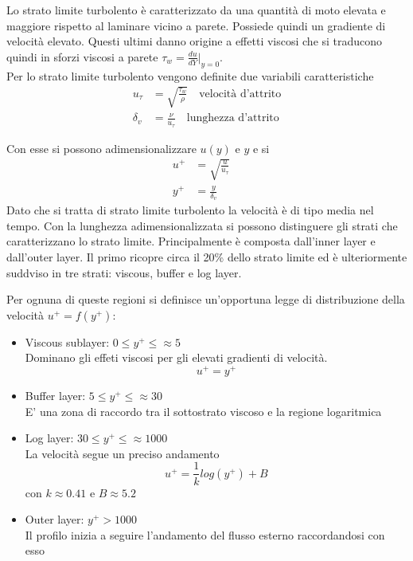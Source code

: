 



Lo strato limite turbolento è caratterizzato da una quantità di moto elevata e maggiore rispetto al laminare vicino a parete. Possiede quindi un gradiente di velocità elevato. Questi ultimi danno origine a effetti viscosi che si traducono quindi in sforzi viscosi a parete $\tau _w = \frac{du}{dY}|_{y = 0}$.\\
Per lo strato limite turbolento vengono definite due variabili caratteristiche
\begin{align*}
    u_{\tau} &= \sqrt{\frac{\tau_w}{\rho}} \quad \text{velocità d'attrito} \\
    \delta_v &= \frac{\nu}{u_\tau} \quad \text{lunghezza d'attrito}
\end{align*}

Con esse si possono adimensionalizzare $u(y)$ e $y$ e si 
\begin{align*}
    u^+ &= \sqrt{\frac{u}{u_\tau}} \quad  \\
    y^+ &= \frac{y}{\delta _v} \quad 
\end{align*}
Dato che si tratta di strato limite turbolento la velocità è di tipo media nel tempo. Con la lunghezza adimensionalizzata si possono distinguere gli strati che caratterizzano lo strato limite. Principalmente è composta dall'inner layer e dall'outer layer. Il primo ricopre circa il 20\% dello strato limite ed è ulteriormente suddviso in tre strati: viscous, buffer e log layer.

Per ognuna di queste regioni si definisce un'opportuna legge di distribuzione della velocità $u^+ = f(y^+)$:
\begin{itemize}
    \item Viscous sublayer: $0 \le y^+ \le \approx 5$\\
    Dominano gli effeti viscosi per gli elevati gradienti di velocità.
    \begin{equation*}
        u^+ = y^+
    \end{equation*}
    \item Buffer layer: $5 \le y^+ \le \approx 30$\\
    E' una zona di raccordo tra il sottostrato viscoso e la regione logaritmica
    \item Log layer: $30 \le y^+ \le \approx 1000$\\
    La velocità segue un preciso andamento 
    \begin{equation*}
        u^+ = \frac{1}{k}log(y^+) + B
    \end{equation*}
    con $k \approx 0.41$ e $B \approx 5.2$
    \item Outer layer: $y^+ > 1000$\\
    Il profilo inizia a seguire l'andamento del flusso esterno raccordandosi con esso
\end{itemize}

